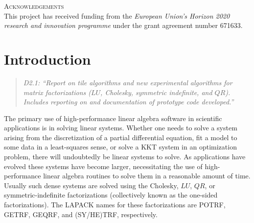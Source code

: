 \documentclass[a4paper,12pt]{article}
\begin{document}
\noindent
\textsc{Acknowledgements}\\[1em]
This project has received funding from the \emph{European Union's Horizon 2020 research and innovation programme} under the grant agreement number 671633.





%

\newpage

\renewcommand{\contentsname}{Table of Contents}
\tableofcontents

\listoffigures

\listoftables





\newpage

%

\section{Introduction}
\label{sec.introduction}
\begin{quotation}
  \emph{
    D2.1:
    ``Report on tile algorithms and new experimental algorithms for
  matrix factorizations ($LU$, Cholesky, symmetric indefinite, and $QR$).
  Includes reporting on and documentation of prototype code developed.''}
\end{quotation}

The primary use of high-performance linear algebra software
in scientific applications is in solving linear systems.
Whether one needs to solve a system arising from the discretization of
a partial differential equation,
fit a model to some data in a least-squares sense,
or solve a KKT system in an optimization problem,
there will undoubtedly be linear systems to solve.
As applications have evolved these systems have become larger,
necessitating the use of high-performance linear algebra routines
to solve them in a reasonable amount of time.
Usually such dense systems are solved using
the Cholesky, $LU$, $QR$, or symmetric-indefinite factorizations
(collectively known as the one-sided factorizations).
The LAPACK names for these factorizations are
POTRF, GETRF, GEQRF, and (SY/HE)TRF, respectively.
\end{document}
